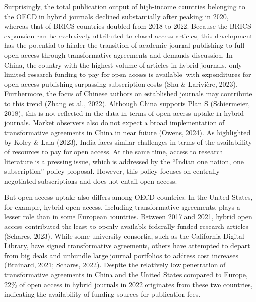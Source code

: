 \documentclass[a4paper,man,floatsintext,longtable,noextraspace,12pt]{apa6}
\begin{document}
Surprisingly, the total publication output of high-income countries
belonging to the OECD in hybrid journals declined substantially after
peaking in 2020, whereas that of BRICS countries doubled from 2018 to
2022. Because the BRICS expansion can be exclusively attributed to
closed access articles, this development has the potential to hinder the
transition of academic journal publishing to full open access through
transformative agreements and demands discussion. In China, the country
with the highest volume of articles in hybrid journals, only limited
research funding to pay for open access is available, with expenditures
for open access publishing surpassing subscription costs (Shu \&
Larivière, 2023). Furthermore, the focus of Chinese authors on
established journals may contribute to this trend (Zhang et al., 2022).
Although China supports Plan S (Schiermeier, 2018), this is not
reflected in the data in terms of open access uptake in hybrid journals.
Market observers also do not expect a broad implementation of
transformative agreements in China in near future (Owens, 2024). As
highlighted by Koley \& Lala (2023), India faces similar challenges in
terms of the availablility of resources to pay for open access. At the
same time, access to research literature is a pressing issue, which is
addressed by the ``Indian one nation, one subscription'' policy
proposal. However, this policy focuses on centrally negotiated
subscriptions and does not entail open access.

But open access uptake also differs among OECD countries. In the United
States, for example, hybrid open access, including transformative
agreements, plays a lesser role than in some European countries. Between
2017 and 2021, hybrid open access contributed the least to openly
available federally funded research articles (Schares, 2023). While some
university consortia, such as the California Digital Library, have
signed transformative agreements, others have attempted to depart from
big deals and unbundle large journal portfolios to address cost
increases (Brainard, 2021; Schares, 2022). Despite the relatively low
penetration of transformative agreements in China and the United States
compared to Europe, 22\% of open access in hybrid journals in 2022
originates from these two countries, indicating the availability of
funding sources for publication fees.
\end{document}
